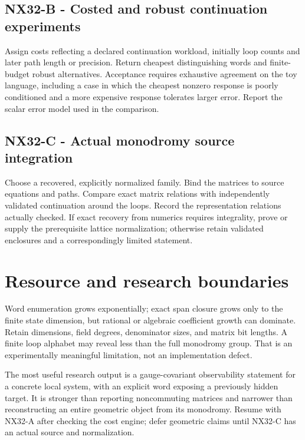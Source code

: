 \documentclass[
  11pt,
  a4paper,
]{report}
\begin{document}
\hypertarget{nx32-b---costed-and-robust-continuation-experiments}{%
\subsection{NX32-B - Costed and robust continuation
experiments}\label{nx32-b---costed-and-robust-continuation-experiments}}

Assign costs reflecting a declared continuation workload, initially loop
counts and later path length or precision. Return cheapest
distinguishing words and finite-budget robust alternatives. Acceptance
requires exhaustive agreement on the toy language, including a case in
which the cheapest nonzero response is poorly conditioned and a more
expensive response tolerates larger error. Report the scalar error model
used in the comparison.

\hypertarget{nx32-c---actual-monodromy-source-integration}{%
\subsection{NX32-C - Actual monodromy source
integration}\label{nx32-c---actual-monodromy-source-integration}}

Choose a recovered, explicitly normalized family. Bind the matrices to
source equations and paths. Compare exact matrix relations with
independently validated continuation around the loops. Record the
representation relations actually checked. If exact recovery from
numerics requires integrality, prove or supply the prerequisite lattice
normalization; otherwise retain validated enclosures and a
correspondingly limited statement.

\hypertarget{resource-and-research-boundaries}{%
\section{Resource and research
boundaries}\label{resource-and-research-boundaries}}

Word enumeration grows exponentially; exact span closure grows only to
the finite state dimension, but rational or algebraic coefficient growth
can dominate. Retain dimensions, field degrees, denominator sizes, and
matrix bit lengths. A finite loop alphabet may reveal less than the full
monodromy group. That is an experimentally meaningful limitation, not an
implementation defect.

The most useful research output is a gauge-covariant observability
statement for a concrete local system, with an explicit word exposing a
previously hidden target. It is stronger than reporting noncommuting
matrices and narrower than reconstructing an entire geometric object
from its monodromy. Resume with NX32-A after checking the cost engine;
defer geometric claims until NX32-C has an actual source and
normalization.
\end{document}
